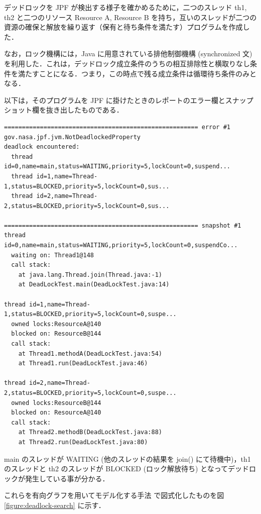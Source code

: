 \documentclass[a4j,12pt]{jarticle}
\begin{document}
デッドロックを JPF が検出する様子を確かめるために，二つのスレッド th1, th2 と二つのリソース Resource A, Resource B を持ち，互いのスレッドが二つの資源の確保と解放を繰り返す（保有と待ち条件を満たす）プログラムを作成した．

なお，ロック機構には，Java に用意されている排他制御機構 (synchronized 文) を利用した．これは，デッドロック成立条件のうちの相互排除性と横取りなし条件を満たすことになる．つまり，この時点で残る成立条件は循環待ち条件のみとなる．

以下は，そのプログラムを JPF に掛けたときのレポートのエラー欄とスナップショット欄を抜き出したものである．

\begin{verbatim}
====================================================== error #1
gov.nasa.jpf.jvm.NotDeadlockedProperty
deadlock encountered:
  thread id=0,name=main,status=WAITING,priority=5,lockCount=0,suspend...
  thread id=1,name=Thread-1,status=BLOCKED,priority=5,lockCount=0,sus...
  thread id=2,name=Thread-2,status=BLOCKED,priority=5,lockCount=0,sus...
   
====================================================== snapshot #1
thread id=0,name=main,status=WAITING,priority=5,lockCount=0,suspendCo...
  waiting on: Thread1@148
  call stack:
	at java.lang.Thread.join(Thread.java:-1)
	at DeadLockTest.main(DeadLockTest.java:14)

thread id=1,name=Thread-1,status=BLOCKED,priority=5,lockCount=0,suspe...
  owned locks:ResourceA@140
  blocked on: ResourceB@144
  call stack:
	at Thread1.methodA(DeadLockTest.java:54)
	at Thread1.run(DeadLockTest.java:46)

thread id=2,name=Thread-2,status=BLOCKED,priority=5,lockCount=0,suspe...
  owned locks:ResourceB@144
  blocked on: ResourceA@140
  call stack:
	at Thread2.methodB(DeadLockTest.java:88)
	at Thread2.run(DeadLockTest.java:80)
\end{verbatim}

main のスレッドが WAITING (他のスレッドの結果を join() にて待機中)，th1 のスレッドと th2 のスレッドが BLOCKED (ロック解放待ち) となってデッドロックが発生している事が分かる．

これらを有向グラフを用いてモデル化する手法 \cite{DBLP:journals/csur/Holt72} \cite{MOS2}で図式化したものを図 \ref{figure:deadlock-search} に示す．
\end{document}
